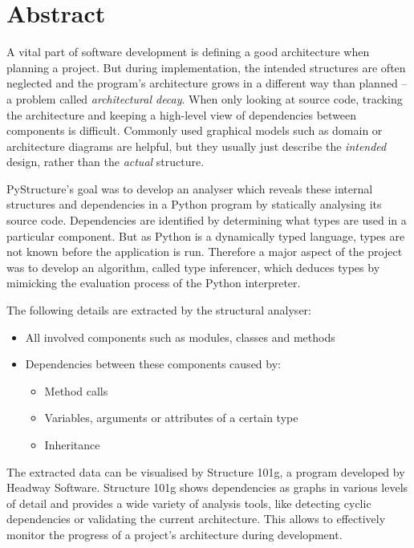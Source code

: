 \documentclass[12pt,halfparskip,DIV11,BCOR10mm]{scrreprt}
\begin{document}
\pagestyle{plain}

\chapter*{Abstract}

A vital part of software development is defining a good architecture when planning a project. But during implementation, the intended structures are often neglected and the program's architecture grows in a different way than planned – a problem called \emph{architectural decay}. When only looking at source code, tracking the architecture and keeping a high-level view of dependencies between components is difficult. Commonly used graphical models such as domain or architecture diagrams are helpful, but they usually just describe the \emph{intended} design, rather than the \emph{actual} structure.

PyStructure's goal was to develop an analyser which reveals these internal structures and dependencies in a Python program by statically analysing its source code. Dependencies are identified by determining what types are used in a particular component. But as Python is a dynamically typed language, types are not known before the application is run. Therefore a major aspect of the project was to develop an algorithm, called type inferencer, which deduces types by mimicking the evaluation process of the Python interpreter.

The following details are extracted by the structural analyser:

\begin{itemize}
    \item All involved components such as modules, classes and methods
    \item Dependencies between these components caused by:
    \begin{itemize}
        \item Method calls
        \item Variables, arguments or attributes of a certain type
        \item Inheritance
    \end{itemize}
\end{itemize}

The extracted data can be visualised by Structure 101g, a program developed by Headway Software. Structure 101g shows dependencies as graphs in various levels of detail and provides a wide variety of analysis tools, like detecting cyclic dependencies or validating the current architecture. This allows to effectively monitor the progress of a project's architecture during development.
\end{document}
